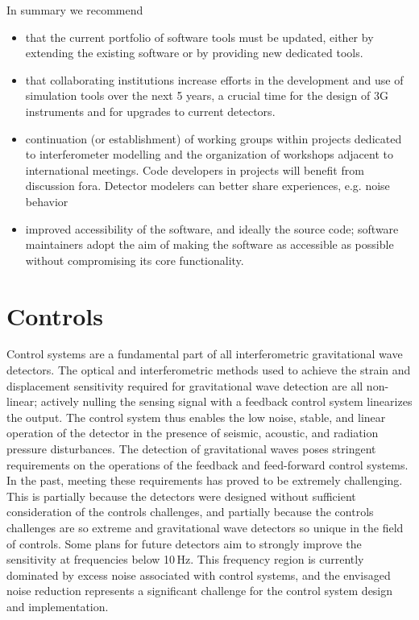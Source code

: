 In summary we recommend
\begin{itemize}
\item that the current portfolio of software tools must be updated, either by extending the existing software or by providing new dedicated tools.  
\item  that collaborating institutions increase efforts in the development and use of simulation tools over the next 5 years, a crucial time for the design of \ac{3G}  instruments and for upgrades to current detectors.
\item continuation (or establishment) of working groups within projects dedicated to interferometer modelling and the organization of workshops adjacent to international meetings. Code developers in projects will benefit from discussion fora. Detector modelers can better share experiences, e.g. noise behavior
\item  improved accessibility of the software, and ideally the source code;  software maintainers adopt the aim of making the software as accessible as possible without compromising its core functionality. 

\end{itemize}

\section{Controls}
\label{sec:Controls}
Control systems are a fundamental part of all interferometric gravitational wave detectors. The optical and interferometric methods used to achieve the strain and displacement sensitivity required for gravitational wave detection are all non-linear; actively nulling the sensing signal with a feedback control system linearizes the output. 
The control system thus enables the low noise, stable, and linear operation of the detector in the presence of seismic, acoustic, and radiation pressure disturbances.
The detection of gravitational waves poses stringent requirements on the operations of the feedback and feed-forward control systems.
In the past, meeting these requirements has proved to be extremely challenging.
This is partially because the detectors were designed without sufficient consideration of the controls challenges, and partially because the controls challenges are so extreme and gravitational wave detectors so unique in the field of controls.
Some plans for future detectors aim to strongly improve the sensitivity at frequencies below 10\,Hz. This frequency region is currently dominated by excess noise associated with control systems, and the envisaged noise reduction represents a significant challenge for the control system design and implementation.

